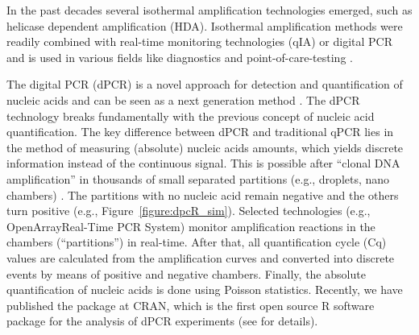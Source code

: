 In the past decades several isothermal amplification technologies emerged, such 
as helicase dependent amplification (HDA). Isothermal 
amplification methods were readily combined with real-time monitoring technologies (qIA) 
or digital PCR and is used in various fields like diagnostics and 
point-of-care-testing \citep{selck_2013, rodiger_nucleic_2014, nixon_2014}.

The digital PCR (dPCR) is a novel approach for detection and quantification of 
nucleic acids and can be seen as a next generation method 
\citep{huggett_qpcr_2015}. The dPCR technology breaks fundamentally with the 
previous concept of nucleic acid quantification. The key difference between dPCR 
and traditional qPCR lies in the method of measuring (absolute) nucleic acids 
amounts, which yields discrete information instead of the continuous signal. 
This is possible after ``clonal DNA amplification'' in thousands of small 
separated partitions (e.g., droplets, nano chambers) \citep{huggett_2013, 
milbury_2014, morley_2014}. The partitions with no nucleic acid remain negative 
and the others turn positive (e.g., Figure~\ref{figure:dpcR_sim}). Selected 
technologies (e.g., OpenArray\textregistered Real-Time PCR System) monitor 
amplification reactions in the chambers (``partitions'') in real-time. After 
that, all quantification cycle (Cq) values are calculated from the amplification 
curves and converted into discrete events by means of positive and negative 
chambers. Finally, the absolute quantification of nucleic acids is done using 
Poisson statistics. Recently, we have published the  package at 
CRAN, which is the first open source R software package for the analysis of dPCR 
experiments (see  for details).

